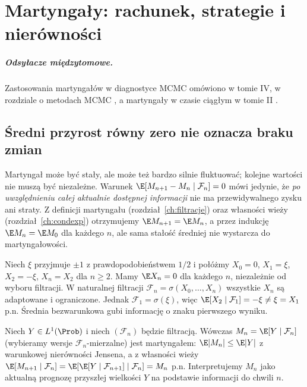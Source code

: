 \chapter{Martyngały: rachunek, strategie i nierówności}
\label{ch:martyngaly}
\paragraph{Odsyłacze międzytomowe.}
Zastosowania martyngałów w diagnostyce MCMC omówiono
w tomie IV, w rozdziale o metodach MCMC%
,
a martyngały w czasie ciągłym w tomie II%
.


\section{Średni przyrost równy zero nie oznacza braku zmian}

Martyngał może być stały, ale może też bardzo
silnie fluktuować; kolejne wartości nie muszą być
niezależne. Warunek
$\E[M_{n+1}-M_n\mid\mathcal F_n]=0$
mówi jedynie, że \emph{po uwzględnieniu całej
aktualnie dostępnej informacji} nie ma
przewidywalnego zysku ani straty.
Z definicji martyngału (rozdział~\ref{ch:filtracje})
oraz własności wieży (rozdział~\ref{ch:condexp})
otrzymujemy $\E M_{n+1}=\E M_n$,
a przez indukcję $\E M_n=\E M_0$ dla każdego $n$,
ale sama stałość średniej nie wystarcza do
martyngałowości.

\begin{przyklad}
Niech $\xi$ przyjmuje $\pm1$ z prawdopodobieństwem
$1/2$ i połóżmy $X_0=0$, $X_1=\xi$,
$X_2=-\xi$, $X_n=X_2$ dla $n\geq2$.
Mamy $\E X_n=0$ dla każdego $n$, niezależnie
od wyboru filtracji. W naturalnej filtracji
$\mathcal F_n=\sigma(X_0,\ldots,X_n)$ wszystkie
$X_n$ są adaptowane i ograniczone. Jednak
$\mathcal F_1=\sigma(\xi)$, więc
$\E[X_2\mid\mathcal F_1]=-\xi\ne\xi=X_1$ p.n.
Średnia bezwarunkowa gubi informację o znaku
pierwszego wyniku.
\end{przyklad}

\begin{przyklad}
Niech $Y\in L^1(\Prob)$ i niech $(\mathcal F_n)$
będzie filtracją. Wówczas
$M_n=\E[Y\mid\mathcal F_n]$ (wybieramy wersje
$\mathcal F_n$-mierzalne) jest martyngałem:
$\E|M_n|\leq\E|Y|$ z warunkowej nierówności
Jensena, a z własności wieży
$\E[M_{n+1}\mid\mathcal F_n]=
\E[\E[Y\mid\mathcal F_{n+1}]\mid\mathcal F_n]=M_n$ p.n.
Interpretujemy $M_n$ jako aktualną prognozę
przyszłej wielkości $Y$ na podstawie informacji
do chwili $n$.
\end{przyklad}

